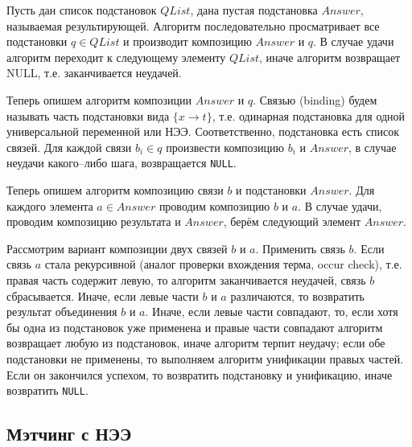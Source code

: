 Пусть дан список подстановок $QList$, дана пустая подстановка $Answer$, называемая результирующей. Алгоритм последовательно просматривает все подстановки $q \in QList$ и производит композицию $Answer$ и $q$. В случае удачи алгоритм переходит к следующему элементу $QList$, иначе алгоритм возвращает NULL, т.е. заканчивается неудачей.

Теперь опишем алгоритм композиции $Answer$ и $q$. Связью (binding) будем называть часть подстановки вида $\{x \rightarrow t\}$, т.е. одинарная подстановка для одной универсальной переменной или НЭЭ. Соответственно, подстановка есть список связей. %
Для каждой связи $b_i \in q$ произвести композицию $b_i$ и $Answer$, в случае неудачи какого--либо шага, возвращается \texttt{NULL}.

Теперь опишем алгоритм композицию связи $b$ и подстановки $Answer$. Для каждого элемента $a \in Answer$ проводим композицию $b$ и $a$. В случае удачи, проводим композицию результата и $Answer$, берём следующий элемент $Answer$.

Рассмотрим вариант композиции двух связей $b$ и $a$. Применить связь $b$. Если связь $a$ стала рекурсивной (аналог проверки вхождения терма, occur check), т.е. правая часть содержит левую, то алгоритм заканчивается неудачей, связь $b$  сбрасывается. Иначе, если левые части $b$ и $a$ различаются, то возвратить результат объединения $b$ и $a$. Иначе, если левые части совпадают, то, если хотя бы одна из подстановок уже применена и правые части совпадают алгоритм возвращает любую из подстановок, иначе алгоритм терпит неудачу; если обе подстановки не применены, то выполняем алгоритм унификации правых частей. Если он закончился успехом, то возвратить подстановку и унификацию, иначе возвратить \texttt{NULL}.



\subsection{Мэтчинг с НЭЭ}

